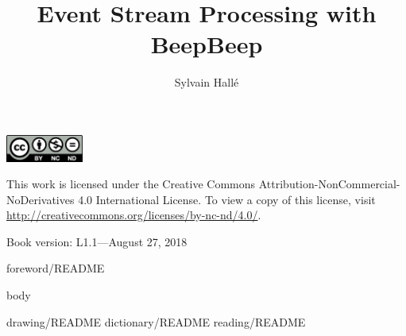 \documentclass{lifmanual}
\title{Event Stream Processing with BeepBeep}
\author{Sylvain Hallé}
\begin{document}
\frontmatter

\newpage

\cleardoublepage

\newpage

\thispagestyle{empty}
\pagestyle{empty}
\rule{0in}{6in}
\noindent
\includegraphics[width=1in]{by-nc-nd}\\
{\sf\small
\noindent
This work is licensed under the Creative Commons Attribution-NonCommercial-NoDerivatives 4.0 International License. To view a copy of this license, visit \url{http://creativecommons.org/licenses/by-nc-nd/4.0/}.\\

\noindent
\rule{0in}{8pt}
\noindent
Book version: L1.1---August 27, 2018}


\pagestyle{toc}
\tableofcontents
\newpage
{foreword/README}

\mainmatter
\thispagestyle{normal}
\pagestyle{normal}

{body}

\appendix
\renewcommand{\chaptername}{Appendix}
{drawing/README}
{dictionary/README}
{reading/README}

\pagestyle{index}
\printindex

\cleardoublepage
\thispagestyle{empty}
\phantom{W}
\newpage

\end{document}
